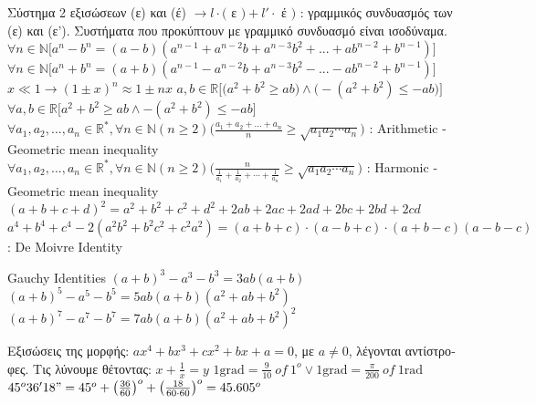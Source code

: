 \documentclass[12pt]{article}
\begin{document}
\begin{flushleft}
   \textbullet \quad \textgreek{Σύστημα 2 εξισώσεων (ε) και (έ)} $ \rightarrow l\cdot ($ \textgreek{ε} $) + l'\cdot $ \textgreek{έ} $) $  :  \textgreek{γραμμικός συνδυασμός των (ε) και (ε'). Συστήματα που προκύπτουν με γραμμικό συνδυασμό είναι ισοδύναμα.} \linebreak
   \textbullet \quad $ \forall n \in \mathbb{N} \Big[a^n -b^n = (a-b)(a^{n-1} + a^{n-2}b + a^{n-3}b^2 + ... + ab^{n-2} + b^{n-1}) \Big] $ \linebreak
   \textbullet \quad $ \forall n \in \mathbb{N} \Big[a^n +b^n = (a+b)(a^{n-1} - a^{n-2}b + a^{n-3}b^2 - ... - ab^{n-2} + b^{n-1}) \Big] $ \linebreak
	\textbullet \quad $ x \ll 1 \rightarrow (1 \pm x)^n \approx 1 \pm nx $ \linebreak
	\textbullet \quad $ a, b \in \mathbb{R} \Big[ \big(a^2 + b^2 \geq ab \big) \land \big(- (a^2 + b^2) \leq -ab \big) \Big] $ \linebreak 
	\textbullet \quad $ \forall a, b \in \mathbb{R} \Big[ a^2 + b^2 \geq ab \land -(a^2 + b^2) \leq -ab \Big] $ \linebreak 
	\textbullet \quad $ \forall a_1, a_2, ..., a_n \in \mathbb{R}^*, \forall n \in \mathbb{N}(n\geq 2) \Big(\frac{a_1 + a_2 + ... + a_n}{n} \geq \sqrt{a_1a_2\cdots a_n} \Big) $  :  Arithmetic - Geometric mean inequality \linebreak
	\textbullet \quad $\displaystyle \forall a_1, a_2, ..., a_n \in \mathbb{R}^*, \forall n \in \mathbb{N}(n\geq 2) \Big(\frac{n}{\frac{1}{a_1} + \frac{1}{a_2} + \cdots + \frac{1}{a_n}} \geq \sqrt{a_1a_2\cdots a_n} \Big) $  :  Harmonic - Geometric mean inequality \linebreak
	\textbullet \quad $(a + b + c + d)^2 = a^2 + b^2 + c^2 +d^2 +2ab + 2ac + 2ad +2bc +2bd +2cd $ \linebreak
	\textbullet \quad $ a^4 + b^4 + c^4 -2(a^2b^2 + b^2 c^2 +c^2a^2)=(a+b+c)\cdot(a-b+c)\cdot(a+b-c)(a-b-c) $  :  De Moivre Identity \linebreak
	
	Gauchy Identities \linebreak
	\textbullet \quad $ (a+b)^3 -a^3 -b^3 =3ab(a+b) $ \linebreak
	\textbullet \quad $ (a+b)^5 -a^5 -b^5 = 5ab(a+b)(a^2+ab+b^2) $ \linebreak
	\textbullet \quad $ (a+b)^7 -a^7 -b^7 = 7ab(a+b)(a^2+ab+b^2)^2 $ \linebreak
	
	\textgreek{Εξισώσεις της μορφής}: $ax^4 + bx^3 +cx^2 +bx +a = 0$, \textgreek{με} $a\neq 0$, \textgreek{λέγονται αντίστροφες. Τις λύνουμε θέτοντας}: $\displaystyle x+\frac{1}{x} = y $ \linebreak
	\textbullet \quad $ 1 \text{grad} = \frac{9}{10}\ of \ 1^o \lor 1\text{grad} = \frac{\pi}{200}\ of \ 1 \text{rad}$ \linebreak
    \textbullet \quad $ 45^o36'18" = 45^o + \big(\frac{36}{60}\big)^o + \big(\frac{18}{60\cdot 60}\big)^o = 45.605^o $ \linebreak 
    


\end{flushleft}
\end{document}
